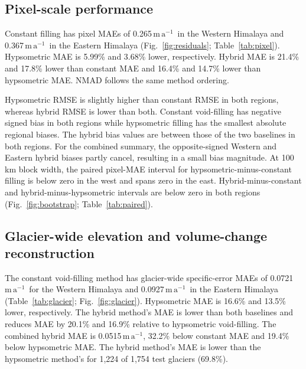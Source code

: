 \documentclass[tc,manuscript]{copernicus}
\newcommand{\rate}{\ensuremath{\mathrm{m\,a^{-1}}}}
\begin{document}
\subsection{Pixel-scale performance}
Constant filling has pixel MAEs of 0.265\,\rate\ in the Western Himalaya and 0.367\,\rate\ in the Eastern Himalaya (Fig.~\ref{fig:residuals}; Table~\ref{tab:pixel}). Hypsometric MAE is 5.99\% and 3.68\% lower, respectively. Hybrid MAE is 21.4\% and 17.8\% lower than constant MAE and 16.4\% and 14.7\% lower than hypsometric MAE. NMAD follows the same method ordering.


\FloatBarrier



\FloatBarrier

Hypsometric RMSE is slightly higher than constant RMSE in both regions, whereas hybrid RMSE is lower than both. Constant void-filling has negative signed bias in both regions while hypsometric filling has the smallest absolute regional biases. The hybrid bias values are between those of the two baselines in both regions. For the combined summary, the opposite-signed Western and Eastern hybrid biases partly cancel, resulting in a small bias magnitude. At 100\,km block width, the paired pixel-MAE interval for hypsometric-minus-constant filling is below zero in the west and spans zero in the east. Hybrid-minus-constant and hybrid-minus-hypsometric intervals are below zero in both regions (Fig.~\ref{fig:bootstrap}; Table~\ref{tab:paired}).


\FloatBarrier



\FloatBarrier


\subsection{Glacier-wide elevation and volume-change reconstruction}
The constant void-filling method has glacier-wide specific-error MAEs of 0.0721\,\rate\ for the Western Himalaya and 0.0927\,\rate\ in the Eastern Himalaya (Table~\ref{tab:glacier}; Fig.~\ref{fig:glacier}). Hypsometric MAE is 16.6\% and 13.5\% lower, respectively. The hybrid method's MAE is lower than both baselines and reduces MAE by 20.1\% and 16.9\% relative to hypsometric void-filling. The combined hybrid MAE is 0.0515\,\rate, 32.2\% below constant MAE and 19.4\% below hypsometric MAE. The hybrid method's MAE is lower than the hypsometric method's for 1,224 of 1,754 test glaciers (69.8\%).
\end{document}
